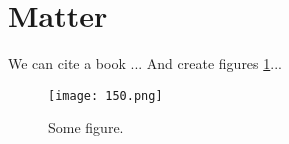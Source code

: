 \section{Matter}
We can cite a book \cite{texbook}... And create figures \ref{figure}...
\par
\lipsum[2-5]
\begin{figure}
\centering
\texttt{[image: 150.png]}
\caption{Some figure.}
\label{figure}
\end{figure}